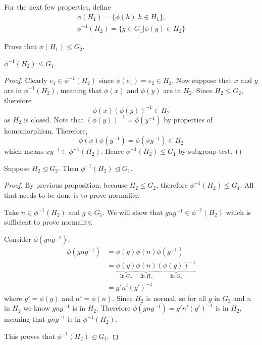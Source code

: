 \newpage

For the next few properties, define
\begin{gather*}
    \phi(H_1) = \{\phi(h) \vert h \in H_1\},\\
    \phi^{-1}(H_2) = \{g \in G_1 \vert \phi(g) \in H_2\}
\end{gather*}

\begin{exercise}
    Prove that $\phi(H_1) \leq G_2$.
\end{exercise}

\begin{proposition}\label{prop-homomorphism-inverse-is-subgroup}
    $\phi^{-1}(H_2) \leq G_1$.
\end{proposition}
\begin{proof}
    Clearly $e_1 \in \phi^{-1}(H_2)$ since $\phi(e_1) = e_2 \in H_2$. Now suppose that $x$ and $y$ are in $\phi^{-1}(H_2)$, meaning that $\phi(x)$ and $\phi(y)$ are in $H_2$. Since $H_2 \leq G_2$, therefore
    \[
        \phi(x)\left(\phi(y)\right)^{-1} \in H_2
    \]
    as $H_2$ is closed. Note that $\left(\phi(y)\right)^{-1} = \phi(y^{-1})$ by properties of homomorphism. Therefore,
    \[
        \phi(x)\phi(y^{-1}) = \phi(xy^{-1}) \in H_2
    \]
    which means $xy^{-1} \in \phi^{-1}(H_2)$. Hence $\phi^{-1}(H_2) \leq G_1$ by subgroup test.
\end{proof}

\begin{proposition}
    Suppose $H_2 \unlhd G_2$. Then $\phi^{-1}(H_2) \unlhd G_1$.
\end{proposition}
\begin{proof}
    By previous proposition, because $H_2 \leq G_2$, therefore $\phi^{-1}(H_2) \leq G_1$. All that needs to be done is to prove normality.

    Take $n \in \phi^{-1}(H_2)$ and $g \in G_1$. We will show that $gng^{-1} \in \phi^{-1}(H_2)$ which is sufficient to prove normality.

    Consider $\phi(gng^{-1})$.
    \begin{align*}
        \phi(gng^{-1}) &= \phi(g)\phi(n)\phi(g^{-1}) \\
        &= \underbrace{\phi(g)}_{\text{In }G_2} \underbrace{\phi(n)}_{\text{In }H_2} \underbrace{\left(\phi(g)\right)^{-1}}_{\text{In }G_2}\\
        &= g'n'(g')^{-1}
    \end{align*}
    where $g' = \phi(g)$ and $n' = \phi(n)$. Since $H_2$ is normal, so for all $g$ in $G_2$ and $n$ in $H_2$ we know $gng^{-1}$ is in $H_2$. Therefore $\phi(gng^{-1}) = g'n'(g')^{-1}$ is in $H_2$, meaning that $gng^{-1}$ is in $\phi^{-1}(H_2)$.

    This proves that $\phi^{-1}(H_2) \unlhd G_1$.
\end{proof}


